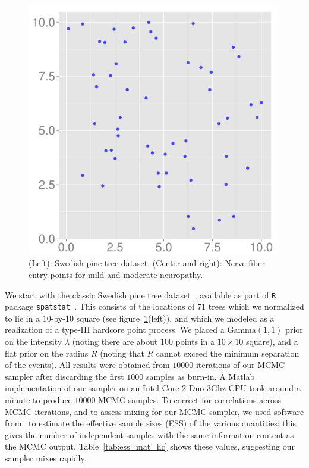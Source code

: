 \documentclass{statsoc}
\begin{document}
\begin{figure}
\begin{minipage}[h]{0.32\linewidth}
  \end{minipage}
  \begin{minipage}[h]{0.32\linewidth}
  \centering
  \includegraphics[width=0.99\textwidth]{figs/mod1.pdf}
  \end{minipage}
  \caption[Post Pred]{(Left): Swedish pine tree dataset. (Center and right): Nerve fiber entry points for mild and moderate neuropathy.}
  \label{fig:diab}
  \end{figure}
  We start with the classic Swedish pine tree dataset~\citep{Ripley88},
available as part of \texttt{R} package \texttt{spatstat}~\citep{spatstat}. 
This consists of the locations of $71$ trees which we normalized to lie in a $10$-by-$10$ square (see figure~\ref{fig:diab}(left)), 
and which we modeled as a realization of a \matern type-III hardcore point process. 
We placed a $\text{Gamma}(1,1)$ prior on the intensity $\lambda$ (noting there are about $100$ points in a $10\times10$ square), and a flat prior on 
the radius $R$ (noting that $R$ cannot exceed the minimum separation of the \matern events). 
All results were obtained from $10000$ iterations of our MCMC sampler after discarding the first
$1000$ samples as burn-in. 
A Matlab implementation of our sampler 
on an Intel Core 2 Duo $3$Ghz CPU took around a minute to produce $10000$ MCMC samples.
To correct for correlations across MCMC iterations, and to assess mixing for our MCMC sampler, we used software from~\cite{Rcoda2006} to
estimate the effective sample sizes (ESS) of the various quantities; this gives the number of independent samples with the same information content as
the MCMC output.
Table~\ref{tab:ess_mat_hc} shows these values, suggesting our sampler mixes rapidly.
\end{document}
